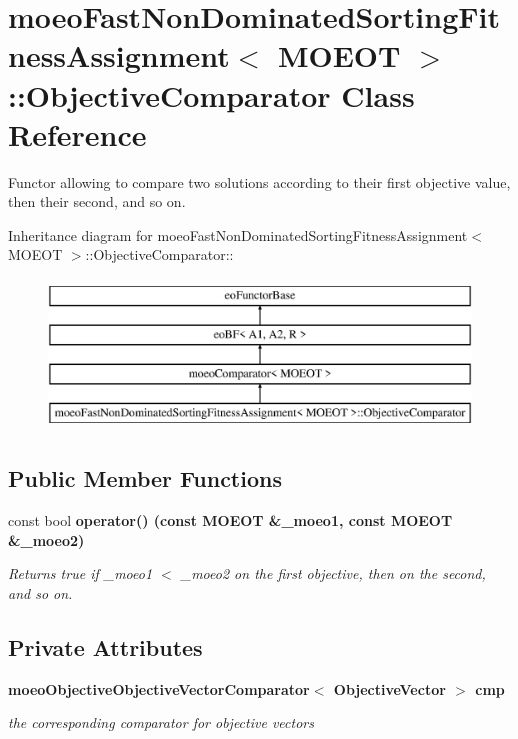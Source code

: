 \section{moeo\-Fast\-Non\-Dominated\-Sorting\-Fitness\-Assignment$<$ MOEOT $>$::Objective\-Comparator Class Reference}
\label{classmoeoFastNonDominatedSortingFitnessAssignment_1_1ObjectiveComparator}
Functor allowing to compare two solutions according to their first objective value, then their second, and so on.  


Inheritance diagram for moeo\-Fast\-Non\-Dominated\-Sorting\-Fitness\-Assignment$<$ MOEOT $>$::Objective\-Comparator::\begin{figure}[H]
\begin{center}
\leavevmode
\includegraphics[height=4cm]{classmoeoFastNonDominatedSortingFitnessAssignment_1_1ObjectiveComparator}
\end{center}
\end{figure}
\subsection*{Public Member Functions}
\begin{CompactItemize}
\item 
const bool \bf{operator()} (const MOEOT \&\_\-moeo1, const MOEOT \&\_\-moeo2)
\begin{CompactList}\small\item\em Returns true if \_\-moeo1 $<$ \_\-moeo2 on the first objective, then on the second, and so on. \item\end{CompactList}\end{CompactItemize}
\subsection*{Private Attributes}
\begin{CompactItemize}
\item 
\bf{moeo\-Objective\-Objective\-Vector\-Comparator}$<$ \bf{Objective\-Vector} $>$ \bf{cmp}\label{classmoeoFastNonDominatedSortingFitnessAssignment_1_1ObjectiveComparator_2280f5d8df81b5c69676fa4fade67719}

\begin{CompactList}\small\item\em the corresponding comparator for objective vectors \item\end{CompactList}\end{CompactItemize}


